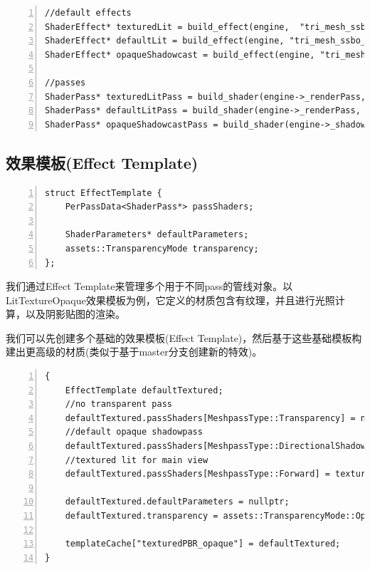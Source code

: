 \documentclass{ctexart}
\begin{document}
\begin{lstlisting}[language={[ANSI]C},keywordstyle=\color{blue!70},commentstyle=\color{red!50!green!50!blue!50},frame=shadowbox, rulesepcolor=\color{red!20!green!20!blue!20},basicstyle=\small,numbers=left, numberstyle=\tiny,breaklines=true]
//default effects
ShaderEffect* texturedLit = build_effect(engine,  "tri_mesh_ssbo_instanced.vert.spv" ,"textured_lit.frag.spv" );
ShaderEffect* defaultLit = build_effect(engine, "tri_mesh_ssbo_instanced.vert.spv" , "default_lit.frag.spv" );
ShaderEffect* opaqueShadowcast = build_effect(engine, "tri_mesh_ssbo_instanced_shadowcast.vert.spv","");

//passes
ShaderPass* texturedLitPass = build_shader(engine->_renderPass,forwardBuilder, texturedLit);
ShaderPass* defaultLitPass = build_shader(engine->_renderPass, forwardBuilder, defaultLit);
ShaderPass* opaqueShadowcastPass = build_shader(engine->_shadowPass,shadowBuilder, opaqueShadowcast);
\end{lstlisting}

\subsection{效果模板(Effect Template)}

\begin{lstlisting}[language={[ANSI]C},keywordstyle=\color{blue!70},commentstyle=\color{red!50!green!50!blue!50},frame=shadowbox, rulesepcolor=\color{red!20!green!20!blue!20},basicstyle=\small,numbers=left, numberstyle=\tiny,breaklines=true]
struct EffectTemplate {
	PerPassData<ShaderPass*> passShaders;

	ShaderParameters* defaultParameters;
	assets::TransparencyMode transparency;
};
\end{lstlisting}

我们通过Effect Template来管理多个用于不同pass的管线对象。以LitTextureOpaque效果模板为例，它定义的材质包含有纹理，并且进行光照计算，以及阴影贴图的渲染。

我们可以先创建多个基础的效果模板(Effect Template)，然后基于这些基础模板构建出更高级的材质(类似于基于master分支创建新的特效)。

\begin{lstlisting}[language={[ANSI]C},keywordstyle=\color{blue!70},commentstyle=\color{red!50!green!50!blue!50},frame=shadowbox, rulesepcolor=\color{red!20!green!20!blue!20},basicstyle=\small,numbers=left, numberstyle=\tiny,breaklines=true]
{
	EffectTemplate defaultTextured;
	//no transparent pass
	defaultTextured.passShaders[MeshpassType::Transparency] = nullptr;
	//default opaque shadowpass
	defaultTextured.passShaders[MeshpassType::DirectionalShadow] = opaqueShadowcastPass;
	//textured lit for main view
	defaultTextured.passShaders[MeshpassType::Forward] = texturedLitPass;

	defaultTextured.defaultParameters = nullptr;
	defaultTextured.transparency = assets::TransparencyMode::Opaque;

	templateCache["texturedPBR_opaque"] = defaultTextured;
}
\end{lstlisting}
\end{document}
